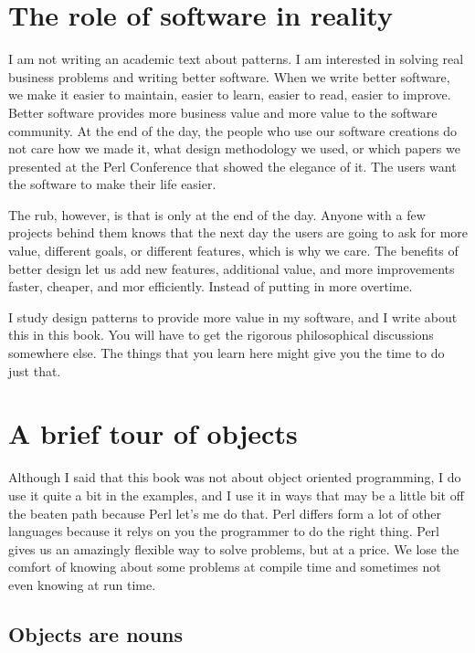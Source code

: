 	\section{The role of software in reality}
	
I am not writing an academic text about patterns. I am interested
in solving real business problems and writing better software. 
When we write better software, we make it easier to maintain, easier
to learn, easier to read, easier to improve.  Better software
provides more business value and more value to the software
community.  At the end of the day, the people who use our
software creations do not care how we made it, what design
methodology we used, or which papers we presented at the 
Perl Conference that showed the elegance of it.  The users
want the software to make their life easier.  

The rub, however, is that is only at the end of the day.  Anyone
with a few projects behind them knows that the next day the
users are going to ask for more value, different goals, or
different features, which is why we care.  The benefits of
better design let us add new features, additional value, and
more improvements faster, cheaper, and mor efficiently.  Instead
of putting in more overtime.

I study design patterns to provide more value in my software,
and I write about this in this book.  You will have to get the
rigorous philosophical discussions somewhere else.  The things
that you learn here might give you the time to do just that.
        
    \section{A brief tour of objects}

Although I said that this book was not about object oriented
programming, I do use it quite a bit in the examples, and I 
use it in ways that may be a little bit off the beaten path
because Perl let's me do that.  Perl differs form a lot of
other languages because it relys on you the programmer to do
the right thing.  Perl gives us an amazingly flexible way
to solve problems, but at a price.  We lose the comfort of
knowing about some problems at compile time and sometimes 
not even knowing at run time.

        \subsection{Objects are nouns}

